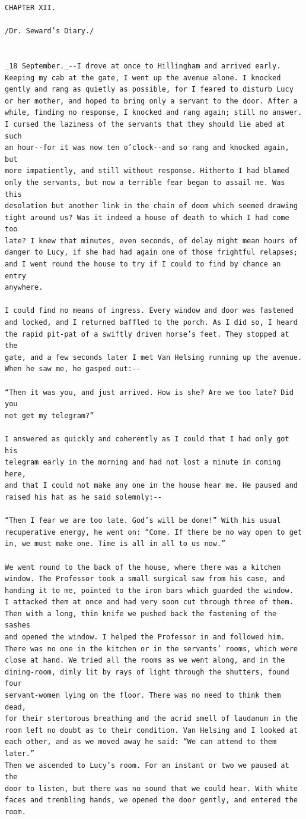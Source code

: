 \documentclass{article}
\begin{document}
\begin{verbatim}
CHAPTER XII.

/Dr. Seward’s Diary./


_18 September._--I drove at once to Hillingham and arrived early.
Keeping my cab at the gate, I went up the avenue alone. I knocked
gently and rang as quietly as possible, for I feared to disturb Lucy
or her mother, and hoped to bring only a servant to the door. After a
while, finding no response, I knocked and rang again; still no answer.
I cursed the laziness of the servants that they should lie abed at such
an hour--for it was now ten o’clock--and so rang and knocked again, but
more impatiently, and still without response. Hitherto I had blamed
only the servants, but now a terrible fear began to assail me. Was this
desolation but another link in the chain of doom which seemed drawing
tight around us? Was it indeed a house of death to which I had come too
late? I knew that minutes, even seconds, of delay might mean hours of
danger to Lucy, if she had had again one of those frightful relapses;
and I went round the house to try if I could to find by chance an entry
anywhere.

I could find no means of ingress. Every window and door was fastened
and locked, and I returned baffled to the porch. As I did so, I heard
the rapid pit-pat of a swiftly driven horse’s feet. They stopped at the
gate, and a few seconds later I met Van Helsing running up the avenue.
When he saw me, he gasped out:--

“Then it was you, and just arrived. How is she? Are we too late? Did you
not get my telegram?”

I answered as quickly and coherently as I could that I had only got his
telegram early in the morning and had not lost a minute in coming here,
and that I could not make any one in the house hear me. He paused and
raised his hat as he said solemnly:--

“Then I fear we are too late. God’s will be done!” With his usual
recuperative energy, he went on: “Come. If there be no way open to get
in, we must make one. Time is all in all to us now.”

We went round to the back of the house, where there was a kitchen
window. The Professor took a small surgical saw from his case, and
handing it to me, pointed to the iron bars which guarded the window.
I attacked them at once and had very soon cut through three of them.
Then with a long, thin knife we pushed back the fastening of the sashes
and opened the window. I helped the Professor in and followed him.
There was no one in the kitchen or in the servants’ rooms, which were
close at hand. We tried all the rooms as we went along, and in the
dining-room, dimly lit by rays of light through the shutters, found four
servant-women lying on the floor. There was no need to think them dead,
for their stertorous breathing and the acrid smell of laudanum in the
room left no doubt as to their condition. Van Helsing and I looked at
each other, and as we moved away he said: “We can attend to them later.”
Then we ascended to Lucy’s room. For an instant or two we paused at the
door to listen, but there was no sound that we could hear. With white
faces and trembling hands, we opened the door gently, and entered the
room.


\end{verbatim}
\end{document}
